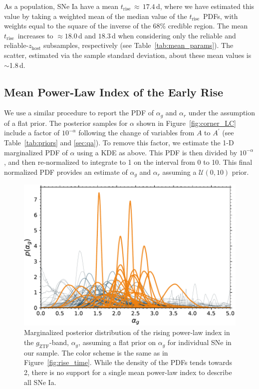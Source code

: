 \documentclass[twocolumn]{./aastex63}
\newcommand{\gztf}{$g_\mathrm{ZTF}$}
\newcommand{\trise}{$t_\mathrm{rise}$}
\begin{document}
As a population, SNe Ia have a mean \trise\,$\approx\,17.4$\,d, where we have
estimated this value by taking a weighted mean of the median value of the
\trise\ PDFs, with weights equal to the square of the inverse of the 68\%
credible region. The mean \trise\ increases to $\approx 18.0$\,d and $18.3$\,d
when considering only the reliable and reliable-$z_\mathrm{host}$ subsamples,
respectively (see Table~\ref{tab:mean_params}). The scatter, estimated via the
sample standard deviation, about these mean values is $\sim$1.8\,d.



\subsection{Mean Power-Law Index of the Early Rise}

We use a similar procedure to report the PDF of $\alpha_g$ and $\alpha_r$
under the assumption of a flat prior. The posterior samples for $\alpha$ shown
in Figure~\ref{fig:corner_LC} include a factor of $10^{-\alpha}$ following the
change of variables from $A$ to $A^\prime$ (see Table~\ref{tab:priors} and
\ref{sec:qa}). To remove this factor, we estimate the 1-D marginalized PDF of
$\alpha$ using a KDE as above. This PDF is then divided by $10^{-\alpha}$, and
then re-normalized to integrate to 1 on the interval from 0 to 10. This final
normalized PDF provides an estimate of $\alpha_g$ and $\alpha_r$ assuming a
$\mathcal{U}(0,10)$ prior.

\begin{figure}
    \centering
    \includegraphics[width=1\linewidth]{./figures/alpha_g.pdf}
    \caption{Marginalized posterior distribution of the rising power-law index
    in the \gztf-band, $\alpha_g$, assuming a flat prior on $\alpha_g$ for
    individual SNe in our sample. The color scheme is the same as in
    Figure~\ref{fig:rise_time}. While the density of the PDFs tends towards 2,
    there is no support for a single mean power-law index to describe all SNe
    Ia.}
    \label{fig:alpha_rise}
\end{figure}
\end{document}
